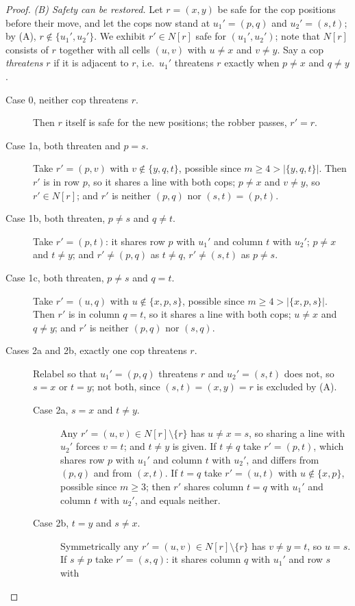 \documentclass[11pt]{amsart}
\theoremstyle{definition}
\begin{document}
\begin{proof}
\smallskip
\noindent\emph{(B) Safety can be restored.} Let $r=(x,y)$ be safe for the cop
positions before their move, and let the cops now stand at $u_1'=(p,q)$ and
$u_2'=(s,t)$; by (A), $r\notin\{u_1',u_2'\}$. We exhibit
$r'\in N[r]$ safe for $(u_1',u_2')$; note that $N[r]$ consists of $r$ together
with all cells $(u,v)$ with $u\neq x$ and $v\neq y$. Say a cop
\emph{threatens} $r$ if it is adjacent to $r$, i.e.\ $u_1'$ threatens $r$
exactly when $p\neq x$ and $q\neq y$.
\begin{description}
\item[Case 0, neither cop threatens $r$.] Then $r$ itself is safe for the new
  positions; the robber passes, $r'=r$.
\item[Case 1a, both threaten and $p=s$.] Take $r'=(p,v)$ with
  $v\notin\{y,q,t\}$, possible since $m\ge4>|\{y,q,t\}|$. Then $r'$ is in row
  $p$, so it shares a line with both cops; $p\neq x$ and $v\neq y$, so
  $r'\in N[r]$; and $r'$ is neither $(p,q)$ nor $(s,t)=(p,t)$.
\item[Case 1b, both threaten, $p\neq s$ and $q\neq t$.] Take $r'=(p,t)$: it
  shares row $p$ with $u_1'$ and column $t$ with $u_2'$; $p\neq x$ and
  $t\neq y$; and $r'\neq(p,q)$ as $t\neq q$, $r'\neq(s,t)$ as $p\neq s$.
\item[Case 1c, both threaten, $p\neq s$ and $q=t$.] Take $r'=(u,q)$ with
  $u\notin\{x,p,s\}$, possible since $m\ge4>|\{x,p,s\}|$. Then $r'$ is in
  column $q=t$, so it shares a line with both cops; $u\neq x$ and $q\neq y$;
  and $r'$ is neither $(p,q)$ nor $(s,q)$.
\item[Cases 2a and 2b, exactly one cop threatens $r$.] Relabel so that
  $u_1'=(p,q)$ threatens $r$ and $u_2'=(s,t)$ does not, so $s=x$ or $t=y$; not
  both, since $(s,t)=(x,y)=r$ is excluded by (A).
  \begin{description}
  \item[Case 2a, $s=x$ and $t\neq y$.] Any $r'=(u,v)\in N[r]\setminus\{r\}$
    has $u\neq x=s$, so sharing a line with $u_2'$ forces $v=t$; and $t\neq y$
    is given. If $t\neq q$ take $r'=(p,t)$, which shares row $p$ with $u_1'$
    and column $t$ with $u_2'$, and differs from $(p,q)$ and from $(x,t)$. If
    $t=q$ take $r'=(u,t)$ with $u\notin\{x,p\}$, possible since $m\ge3$; then
    $r'$ shares column $t=q$ with $u_1'$ and column $t$ with $u_2'$, and
    equals neither.
  \item[Case 2b, $t=y$ and $s\neq x$.] Symmetrically any
    $r'=(u,v)\in N[r]\setminus\{r\}$ has $v\neq y=t$, so $u=s$. If $s\neq p$
    take $r'=(s,q)$: it shares column $q$ with $u_1'$ and row $s$ with

\end{description}
\end{description}
\end{proof}
\end{document}
